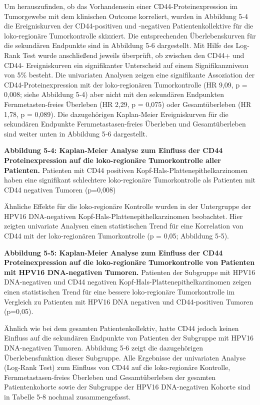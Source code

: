 Um herauszufinden, ob das Vorhandensein einer CD44-Proteinexpression im Tumorgewebe mit dem klinischen Outcome korreliert, wurden in Abbildung 5‑4 die Ereigniskurven der CD44-positiven und -negativen Patientenkollektive für die loko-regionäre Tumorkontrolle skizziert. Die entsprechenden Überlebenskurven für die sekundären Endpunkte sind in Abbildung 5‑6 dargestellt. Mit Hilfe des Log-Rank Test wurde anschließend jeweils überprüft, ob zwischen den CD44+ und CD44- Ereigniskurven ein signifikanter Unterscheid auf einem Signifikanzniveau von 5\% besteht. Die univariaten Analysen zeigen eine signifikante Assoziation der CD44-Proteinexpression mit der loko-regionären Tumorkontrolle (HR 9,09, p = 0,008; siehe Abbildung 5‑4) aber nicht mit den sekundären Endpunkten Fernmetasten-freies Überleben (HR 2,29, p = 0,075) oder Gesamtüberleben (HR 1,78, p = 0,089). Die dazugehörigen Kaplan-Meier Ereigniskurven für die sekundären Endpunkte Fernmetastasen-freies Überleben und Gesamtüberleben sind weiter unten in Abbildung 5‑6 dargestellt.

\begin{quote}
\end{quote}

\textbf{Abbildung 5‑4: Kaplan-Meier Analyse zum Einfluss der CD44 Proteinexpression auf die loko-regionäre Tumorkontrolle aller Patienten.} Patienten mit CD44 positiven Kopf-Hals-Plattenepithelkarzinomen haben eine signifikant schlechtere loko-regionäre Tumorkontrolle als Patienten mit CD44 negativen Tumoren (p=0,008)

Ähnliche Effekte für die loko-regionäre Kontrolle wurden in der Untergruppe der HPV16 DNA-negativen Kopf-Hals-Plattenepithelkarzinomen beobachtet. Hier zeigten univariate Analysen einen statistischen Trend für eine Korrelation von CD44 mit der loko-regionären Tumorkontrolle (p = 0,05; Abbildung 5‑5).

\begin{quote}
\end{quote}

\textbf{Abbildung 5‑5: Kaplan-Meier Analyse zum Einfluss der CD44 Proteinexpression auf die loko-regionäre Tumorkontrolle von Patienten mit HPV16 DNA-negativen Tumoren.} Patienten der Subgruppe mit HPV16 DNA-negativen und CD44 negativen Kopf-Hals-Plattenepithelkarzinomen zeigen einen statistischen Trend für eine bessere loko-regionäre Tumorkontrolle im Vergleich zu Patienten mit HPV16 DNA negativen und CD44-positiven Tumoren (p=0,05).

Ähnlich wie bei dem gesamten Patientenkollektiv, hatte CD44 jedoch keinen Einfluss auf die sekundären Endpunkte von Patienten der Subgruppe mit HPV16 DNA-negativen Tumoren. Abbildung 5‑6 zeigt die dazugehörigen Überlebensfunktion dieser Subgruppe. Alle Ergebnisse der univariaten Analyse (Log-Rank Test) zum Einfluss von CD44 auf die loko-regionäre Kontrolle, Fernmetastasen-freies Überleben und Gesamtüberleben der gesamten Patientenkohorte sowie der Subgruppe der HPV16 DNA-negativen Kohorte sind in Tabelle 5‑8 nochmal zusammengefasst.

